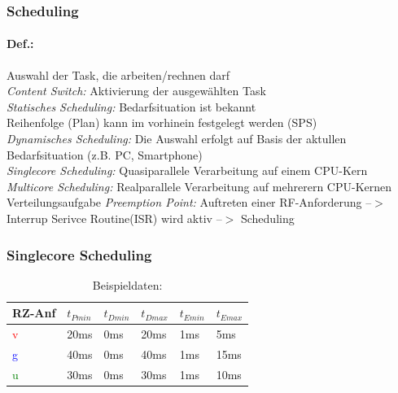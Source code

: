\documentclass[12pt,a4paper,oneside,ngerman]{article}
\begin{document}
\subsubsection{Scheduling}
\paragraph{Def.:}
Auswahl der Task, die arbeiten/rechnen darf \\
\emph{Content Switch:} Aktivierung der ausgewählten Task \\
\emph{Statisches Scheduling:} Bedarfsituation ist bekannt \\
 Reihenfolge (Plan) kann im vorhinein festgelegt werden (SPS)\\
\emph{Dynamisches Scheduling:} Die Auswahl erfolgt auf Basis der aktullen Bedarfsituation (z.B. PC, Smartphone)\\
\emph{Singlecore Scheduling:} Quasiparallele Verarbeitung auf einem CPU-Kern\\
\emph{Multicore Scheduling:} Realparallele Verarbeitung auf mehrerern CPU-Kernen\\
 Verteilungsaufgabe
\emph{Preemption Point:} Auftreten einer RF-Anforderung --$>$ Interrup Serivce Routine(ISR) wird aktiv --$>$ Scheduling

\subsubsection{Singlecore Scheduling}
\begin{table}[H]
	\caption{Beispieldaten:}
	\begin{tabular}{|l|l|l|l|l|l|}
	\hline
	RZ-Anf & \(t_{Pmin}\) & \(t_{Dmin}\) & \(t_{Dmax}\) & \(t_{Emin}\) & \(t_{Emax}\) \\ \hline
	\textcolor{red}{v}      & 20ms         & 0ms          & 20ms         & 1ms          & 5ms          \\ \hline
	\textcolor{blue}{g}      & 40ms         & 0ms          & 40ms         & 1ms          & 15ms         \\ \hline
	\textcolor{green}{u}      & 30ms         & 0ms          & 30ms         & 1ms          & 10ms         \\ \hline
	\end{tabular}
\end{table}
\end{document}
